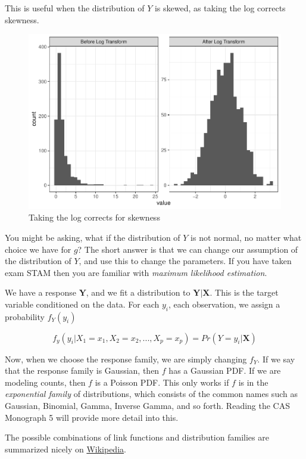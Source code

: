 \documentclass[]{book}
\begin{document}
This is useful when the distribution of \(Y\) is skewed, as taking the log corrects skewness.

\begin{figure}
\centering
\includegraphics{Exam-PA-Study-Manual_files/figure-latex/unnamed-chunk-89-1.pdf}
\caption{\label{fig:unnamed-chunk-89}Taking the log corrects for skewness}
\end{figure}

You might be asking, what if the distribution of \(Y\) is not normal, no matter what choice we have for \(g\)? The short answer is that we can change our assumption of the distribution of \(Y\), and use this to change the parameters. If you have taken exam STAM then you are familiar with \emph{maximum likelihood estimation}.

We have a response \(\mathbf{Y}\), and we fit a distribution to \(\mathbf{Y} | \mathbf{X}\). This is the target variable conditioned on the data. For each \(y_i\), each observation, we assign a probability \(f_Y(y_i)\)

\[
f_y(y_i | X_1 = x_1, X_2 = x_2, ..., X_p = x_p) = Pr(Y = y_i | \mathbf{X})
\]

Now, when we choose the response family, we are simply changing \(f_Y\). If we say that the response family is Gaussian, then \(f\) has a Gaussian PDF. If we are modeling counts, then \(f\) is a Poisson PDF. This only works if \(f\) is in the \emph{exponential family} of distributions, which consists of the common names such as Gaussian, Binomial, Gamma, Inverse Gamma, and so forth. Reading the CAS Monograph 5 will provide more detail into this.

The possible combinations of link functions and distribution families are summarized nicely on \href{https://en.wikipedia.org/wiki/Generalized_linear_model\#Link_function}{Wikipedia}.
\end{document}
